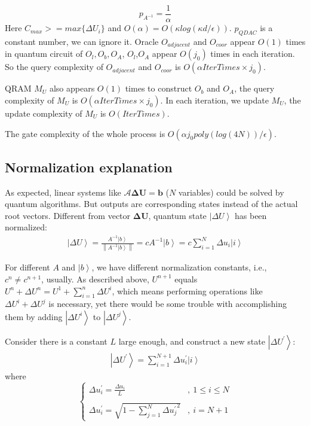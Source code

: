 \documentclass[%
 reprint,
 amsmath,amssymb,
pra,
]{revtex4-1}
\begin{document}
$$
p_{A^{-1}}=\frac{1}{\alpha}
$$
Here $C_{max}>=max\{\Delta U_i\}$ and $O(\alpha)=O(\kappa log(\kappa d/\epsilon))$. $p_{QDAC}$ is a constant number, we can ignore it.
Oracle $O_{adjacent}$ and $O_{coor}$ appear $O(1)$ times in quantum circuit of $O_l,O_b,O_A$, $O_l$,$O_A$ appear $O(j_0)$ times in each iteration. So the query complexity of $O_{adjacent}$ and $O_{coor}$ is $O(\alpha IterTimes\times j_0)$.

QRAM $M_U$ also appears $O(1)$ times to construct $O_b$ and $O_A$, the query complexity of $M_U$ is $O(\alpha IterTimes\times j_0)$. In each iteration, we update $M_U$, the update complexity of $M_U$ is $O(IterTimes)$.

The gate complexity of the whole process is $O(\alpha j_0poly(log(4N))/\epsilon)$.





\subsection{Normalization explanation}
As expected, linear systems like $\mathcal{A} \bm{\Delta U} = \bm{b}$ ($N$ variables) could be solved by quantum algorithms. But outputs are corresponding states instead of the actual root vectors. Different from vector $\bm{\Delta U}$, quantum state $\left| \Delta U\right\rangle$ has been normalized: 
\begin{align}
	\left| \Delta U\right\rangle = \frac{A^{-1} \left|b\right\rangle}{\left\|A^{-1} \left|b\right\rangle\right\|} = c A^{-1} \left|b\right\rangle = c \sum_{i=1}^{N} \Delta u_i\left|i\right\rangle
\end{align}

For different $A$ and $\left|b\right\rangle$, we have different normalization constants, i.e., $c^{n} \neq c^{n+1}$, usually. As described above, $U^{n+1}$ equals $U^{n} + \Delta U^{n} = U^{1} + \sum_{i=1}^{n} \Delta U^{i}$, which means performing operations like $\Delta U^{i} + \Delta U^{j}$ is necessary, yet there would be some trouble with accomplishing them by adding $\left|\Delta U^{i}\right\rangle$ to $\left|\Delta U^{j}\right\rangle$.

Consider there is a constant $L$ large enough, and construct a new state $\left|\Delta U^{\prime}\right\rangle$: 
\begin{align}
	\left|\Delta U^{\prime}\right\rangle = \sum_{i=1}^{N+1}\Delta  u_i^{\prime}\left|i\right\rangle
\end{align}
where
\begin{equation}
	\left\{
	\begin{array}{ll}
		\Delta u_i^{\prime} = \frac{\Delta u_i}{L}&,\ 1\leq i \leq N\\
		&\\
		\Delta u_i^{\prime} = \sqrt{1 - \sum_{j=1}^{N}{\Delta u_j^{\prime}}^2}&,\ i=N+1
	\end{array}
	\right.
\end{equation}
\end{document}
